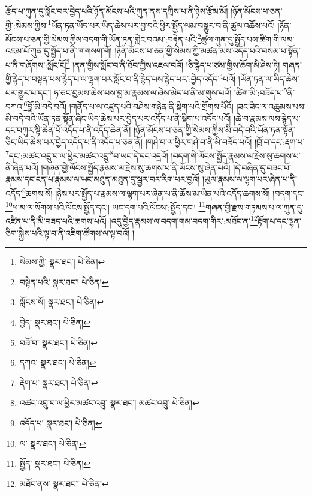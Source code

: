 རྩོད་པ་ཀུན་དུ་སློང་བར་བྱེད་པའི་ཉོན་མོངས་པའི་ཀུན་ནས་དཀྲིས་པ་ནི་ཉེས་རྩོམ་མོ། །ཉོན་མོངས་པ་ཅན་གྱི་:སེམས་ཀྱིས་\footnote{སེམས་ཀྱི་  སྣར་ཐང་།  པེ་ཅིན། }ཡོན་ཏན་ཡོད་པར་ཡིད་ཆེས་པར་བྱ་བའི་ཕྱིར་སྤྱོད་ལམ་བསྒྱུར་བ་ནི་ཚུལ་འཆོས་པའོ། །ཉོན་མོངས་པ་ཅན་གྱི་སེམས་ཀྱིས་བདག་གི་ཡོན་ཏན་གླེང་བའམ་:བརྟེན་པའི་\footnote{བསྟེན་པའི་  སྣར་ཐང་།  པེ་ཅིན། }ཚུལ་ཀུན་དུ་སྤྱོད་པས་ཚིག་གི་ལམ་འཇམ་པོ་ཀུན་དུ་སྤྱོད་པ་ནི་ཁ་གསག་གོ། །ཉོན་མོངས་པ་ཅན་གྱི་སེམས་ཀྱི་མཚན་མས་འདོད་པའི་བསམ་པ་སྟོན་པ་ནི་གཞོགས་:སློང་ངོ།\footnote{སློངས་སོ།  སྣར་ཐང་།  པེ་ཅིན། } །ནན་གྱིས་སློང་བ་ནི་ཐོབ་ཀྱིས་འཇལ་བའོ། །ཅི་རྙེད་པ་ཙམ་གྱིས་ཆོག་མི་ཤེས་ཏེ། གཞན་གྱི་རྙེད་པ་བསྟན་པས་རྙེད་པ་ལ་ལྷག་པར་སློང་བ་ནི་རྙེད་པས་རྙེད་པར་:བྱེད་འདོད་\footnote{བྱེད་  སྣར་ཐང་།  པེ་ཅིན། }པའོ། །ཡོན་ཏན་ལ་ཡིད་ཆེས་པར་གྱུར་པ་དང་། ཧ་ཅང་བྱམས་ཆེས་པས་བླ་མ་རྣམས་ལ་ཞེས་མེད་པ་ནི་མ་གུས་པའོ། །ཚིག་མི་:བཟོད་པ་\footnote{བཟོ་བ་  སྣར་ཐང་།  པེ་ཅིན། }ནི་བཀའ་\footnote{དཀའ་  སྣར་ཐང་།  པེ་ཅིན། }བློ་མི་བདེ་བའོ། །གནོད་པ་ལ་འཛུད་པའི་བཤེས་གཉེན་ནི་སྡིག་པའི་གྲོགས་པོའོ། །ཟང་ཟིང་ལ་འཆུམས་པས་མི་བདེ་བའི་ཡོན་ཏན་སྟོན་ཞིང་ཡིད་ཆེས་པར་བྱེད་པར་འདོད་པ་ནི་སྡིག་པ་འདོད་པའོ། །ཆེ་བ་རྣམས་ལས་རྙེད་པ་དང་བཀུར་སྟི་ཆེན་པོ་འདོད་པ་ནི་འདོད་ཆེན་ནོ། །ཉོན་མོངས་པ་ཅན་གྱི་སེམས་ཀྱིས་མི་བདེ་བའི་ཡོན་ཏན་སྟོན་ཅིང་ཡིད་ཆེས་པར་བྱེད་འདོད་པ་ནི་འདོད་པ་ཅན་ནོ། །གཤེ་བ་ལ་ཕྱིར་གཤེ་བ་ནི་མི་བཟོད་པའོ། །ཁྲོ་བ་དང་:རྡག་པ་\footnote{རྡེག་པ་  སྣར་ཐང་།  པེ་ཅིན། }དང་:མཚང་འདྲུ་བ་ལ་ཕྱིར་མཚང་འདྲུ་\footnote{འཚང་འབྲུ་བ་ལ་ཕྱིར་མཚང་འབྲུ་  སྣར་ཐང་། མཚང་འབྲུ་  པེ་ཅིན། }བ་ཡང་དེ་དང་འདྲའོ། །བདག་གི་ལོངས་སྤྱོད་རྣམས་ལ་རྗེས་སུ་ཆགས་པ་ནི་ཞེན་པའོ། །གཞན་གྱི་ལོངས་སྤྱོད་རྣམས་ལ་རྗེས་སུ་ཆགས་པ་ནི་ཡོངས་སུ་ཞེན་པའོ། །དེ་བཞིན་དུ་བཟང་པོ་རྣམས་དང་ངན་པ་རྣམས་ལ་ཡང་མཐུན་མཐུན་དུ་སྦྱར་བར་རིག་པར་བྱའོ། །ཡུལ་རྣམས་ལ་ལྷག་པར་ཞེན་པ་ནི་འདོད་\footnote{འདོད་པ་  སྣར་ཐང་།  པེ་ཅིན། }ཆགས་སོ། །ཉེས་པར་སྤྱོད་པ་རྣམས་ལ་ལྷག་པར་ཞེན་པ་ནི་ཆོས་མ་ཡིན་པའི་འདོད་ཆགས་སོ། །བདག་དང་\footnote{ལ་  སྣར་ཐང་།  པེ་ཅིན། }ཕ་མ་ལ་སོགས་པའི་ལོངས་སྤྱོད་དང་། ཡང་དག་པའི་ལོངས་:སྤྱོད་དང་། \footnote{སྤྱོད་  སྣར་ཐང་།  པེ་ཅིན། }གཞན་གྱི་རྫས་གཏམས་པ་ལ་ཀུན་དུ་འཛིན་པ་ནི་མི་བཟད་པའི་ཆགས་པའོ། །འདུ་བྱེད་རྣམས་ལ་བདག་གམ་བདག་གིར་:མཐོང་ན་\footnote{མཐོང་ནས་  སྣར་ཐང་།  པེ་ཅིན། }རྟོག་པ་དང་ལྷན་ཅིག་སྐྱེས་པའི་ལྟ་བ་ནི་འཇིག་ཚོགས་ལ་ལྟ་བའོ། །
